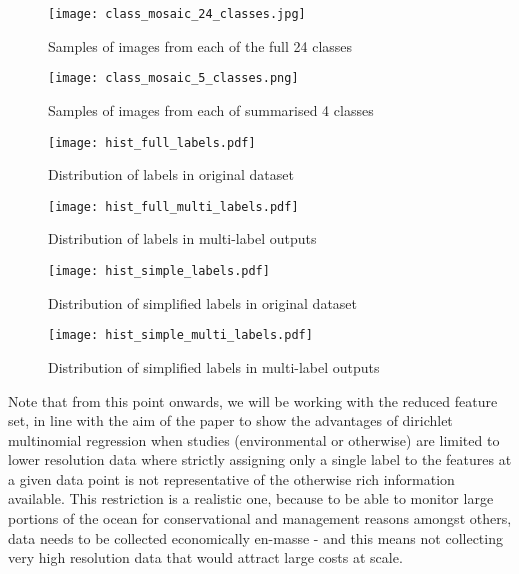 \begin{figure}
    \texttt{[image: class\_mosaic\_24\_classes.jpg]}
    \caption{Samples of images from each of the full 24 classes }
    \label{fig:24classes}
\end{figure}

\begin{figure}
    \texttt{[image: class\_mosaic\_5\_classes.png]}
    \caption{Samples of images from each of summarised 4 classes }
    \label{fig:4classes}
\end{figure}

\begin{figure}[H]
    \begin{minipage}{.47\linewidth}
        \texttt{[image: hist\_full\_labels.pdf]}
        \caption{Distribution of labels in original dataset}
        \label{fig:singlelabeldistr}
    \end{minipage}
    \hfill
    \begin{minipage}{.47\linewidth}
        \texttt{[image: hist\_full\_multi\_labels.pdf]}
        \caption{Distribution of labels in multi-label outputs}
        \label{fig:multilabeldistr}
    \end{minipage}
\end{figure}

\begin{figure}[H]
    \begin{minipage}{.47\linewidth}
        \texttt{[image: hist\_simple\_labels.pdf]}
        \caption{Distribution of simplified labels in original dataset}
        \label{fig:singlelabeldistr}
    \end{minipage}
    \hfill
    \begin{minipage}{.47\linewidth}
        \texttt{[image: hist\_simple\_multi\_labels.pdf]}
        \caption{Distribution of simplified labels in multi-label outputs}
        \label{fig:multilabeldistr}
    \end{minipage}
\end{figure}

Note that from this point onwards, we will be working with the reduced feature set, in line with the aim of the paper to show the advantages of dirichlet multinomial regression when studies (environmental or otherwise) are limited to lower resolution data where strictly assigning only a single label to the features at a given data point is not representative of the otherwise rich information available. This restriction is a realistic one, because to be able to monitor large portions of the ocean for conservational and management reasons amongst others, data needs to be collected economically en-masse - and this means not collecting very high resolution data that would attract large costs at scale.

